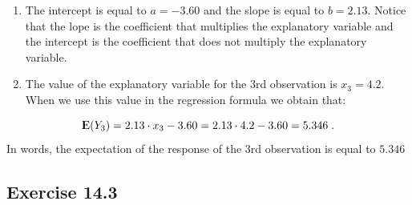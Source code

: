 \documentclass[]{krantz}
\newcommand{\Expec}{{\rm I\kern-.3em E}}
\theoremstyle{definition}
\theoremstyle{definition}
\theoremstyle{definition}
\theoremstyle{remark}
\begin{document}
\begin{enumerate}
\def\labelenumi{\arabic{enumi}.}
\item
  The intercept is equal to \(a = -3.60\) and the slope is equal to
  \(b = 2.13\). Notice that the lope is the coefficient that multiplies
  the explanatory variable and the intercept is the coefficient that
  does not multiply the explanatory variable.
\item
  The value of the explanatory variable for the 3rd observation is
  \(x_3 = 4.2\). When we use this value in the regression formula we
  obtain that:
\end{enumerate}

\[\Expec(Y_3) = 2.13 \cdot x_3 - 3.60 = 2.13 \cdot 4.2 - 3.60 = 5.346\;.\]
In words, the expectation of the response of the 3rd observation is
equal to \(5.346\)

\subsection*{Exercise 14.3}\label{exercise-14.3}
\end{document}
